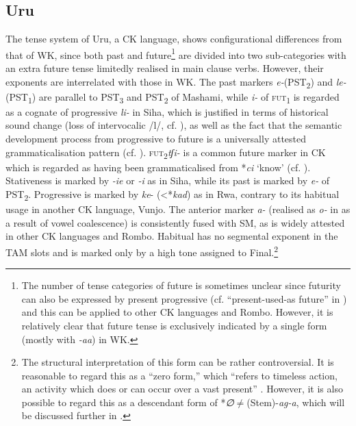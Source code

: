 \documentclass[output=paper]{langscibook}
\begin{document}
\subsection{Uru}\label{sec:shinagawa:2.3}\largerpage

The tense system of Uru, a CK language, shows configurational differences from that of WK, since both past and future\footnote{The number of tense categories of future is sometimes unclear since futurity can also be expressed by present progressive (cf. “present-used-as future” in \citealt{Nurse2003a}) and this can be applied to other CK languages and Rombo. However, it is relatively clear that future tense is exclusively indicated by a single form (mostly with \textit{{}-aa}) in WK.} are divided into two sub-categories with an extra future tense limitedly realised in main clause verbs. However, their exponents are interrelated with those in WK. The past markers \textit{e-}(PST\textsubscript{2}) and \textit{le-}(PST\textsubscript{1}) are parallel to PST\textsubscript{3} and PST\textsubscript{2} of Mashami, while \textit{i-} of \textsc{fut}\textsubscript{1} is regarded as a cognate of progressive \textit{li-} in Siha, which is justified in terms of historical sound change (loss of intervocalic /l/, cf. \citealt[79]{Nurse2003a}), as well as the fact that the semantic development process from progressive to future is a universally attested grammaticalisation pattern (cf. \citealt{BybeeEtAl1994}). \textsc{fut}\textsubscript{2}\textit{tʃi-} is a common future marker in CK which is regarded as having been grammaticalised from *\textit{ci} ‘know’ (cf. \citealt[76]{Nurse2003a}). Stativeness is marked by \textit{{}-ie} or \textit{{}-i} as in Siha, while its past is marked by \textit{e-} of PST\textsubscript{2}. Progressive is marked by \textit{ke}{}- (<*\textit{kad}) as in Rwa, contrary to its habitual usage in another CK language, Vunjo. The anterior marker \textit{a-} (realised as \textit{o-} in  as a result of vowel coalescence) is consistently fused with SM, as is widely attested in other CK languages and Rombo. Habitual has no segmental exponent in the TAM slots and is marked only by a high tone assigned to Final.\footnote{The structural interpretation of this form can be rather controversial. It is reasonable to regard this as a “zero form,” which “refers to timeless action, an activity which does or can occur over a vast present” \citep[81]{Nurse2003a}. However, it is also possible to regard this as a descendant form of *\textit{∅${\neq}$}(Stem)-\textit{ag-a}, which will be discussed further in .}
\end{document}
